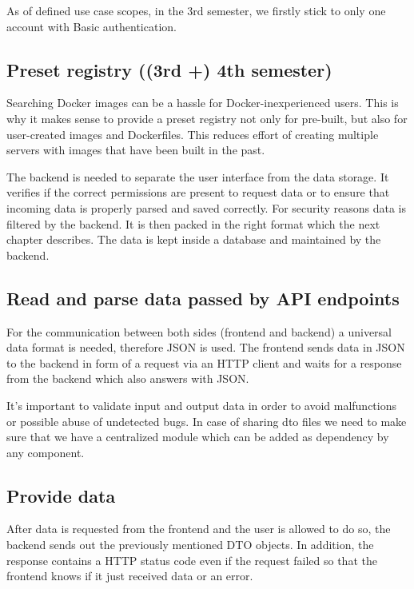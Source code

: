 \documentclass[a4paper,12pt,chapterprefix=false,bibliography=totoc,listof=totoc,]{scrreprt}
\begin{document}
As of defined use case scopes, in the 3rd semester, we firstly stick to only one account with Basic authentication.

\subsection{Preset registry ((3rd +) 4th semester)}
Searching Docker images can be a hassle for Docker-inexperienced users. This is why it makes sense to provide a preset registry not only for pre-built, but also for user-created images and Dockerfiles. This reduces effort of creating multiple servers with images that have been built in the past.

The backend is needed to separate the user interface from the data storage. It verifies if the correct permissions are present to request data or to ensure that incoming data is properly parsed and saved correctly. For security reasons data is filtered by the backend. It is then packed in the right format which the next chapter describes. The data is kept inside a database and maintained by the backend.


\subsection{Read and parse data passed by API endpoints}
For the communication between both sides (frontend and backend) a universal data format is needed, therefore JSON is used. The frontend sends data in JSON to the backend in form of a request via an HTTP client and waits for a response from the backend which also answers with JSON.

It's important to validate input and output data in order to avoid malfunctions or possible abuse of undetected bugs. In case of sharing \gls{dto} files we need to make sure that we have a centralized module which can be added as dependency by any component.

\subsection{Provide data}
After data is requested from the frontend and the user is allowed to do so, the backend sends out the previously mentioned DTO objects. In addition, the response contains a HTTP status code even if the request failed so that the frontend knows if it just received data or an error.
\end{document}
